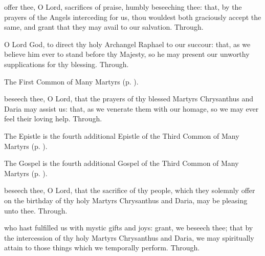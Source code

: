
\secret
{} offer thee, O Lord, sacrifices of praise, humbly beseeching thee: that, by the prayers of the Angels interceding for us, thou wouldest both graciously accept the same, and grant that they may avail to our salvation. Through.


\postcommunion
{} O Lord God, to direct thy holy Archangel Raphael to our succour: that, as we believe him ever to stand before thy Majesty, so he may present our unworthy supplications for thy blessing. Through.



\begin{rubric}
	The First Common of Many Martyrs (p. \pageref{CommonMartyrsI}).
\end{rubric}

\collect
{} beseech thee, O Lord, that the prayers of thy blessed Martyrs Chrysanthus and Daria may assist us: that, as we venerate them with our homage, so we may ever feel their loving help. Through.

\begin{rubric}
	The Epistle is the fourth additional Epistle of the Third Common of Many Martyrs (p. \pageref{2Corinthians64}).
\end{rubric}

\begin{rubric}
	The Gospel is the fourth additional Gospel of the Third Common of Many Martyrs (p. \pageref{Luke1147}).
\end{rubric}

\secret
{} beseech thee, O Lord, that the sacrifice of thy people, which they solemnly offer on the birthday of thy holy Martyrs Chrysanthus and Daria, may be pleasing unto thee. Through.

\postcommunion
{} who hast fulfilled us with mystic gifts and joys: grant, we beseech thee; that by the intercession of thy holy Martyrs Chrysanthus and Daria, we may spiritually attain to those things which we temporally perform. Through.


